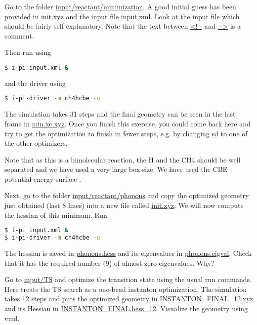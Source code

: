 \documentclass{article}
\begin{document}
\begin{Exercise}[label={reactant},title={Optimizing and analysing the reactant}]

\Question
Go to the folder \url{input/reactant/minimization}.
A good initial guess has been provided in \url{init.xyz} and the input file \url{input.xml}.
Look at the input file which should be fairly self explanatory.  Note that the text between \url{<!--} and \url{-->} is a comment.

Then run \ipi{} using
\begin{lstlisting}[language=bash]
$ i-pi input.xml &
\end{lstlisting}
and the driver using
\begin{lstlisting}[language=bash]
$ i-pi-driver -m ch4hcbe -u
\end{lstlisting}

The simulation takes 31 steps and the final geometry can be seen in the last frame in \url{min.xc.xyz}.
Once you finish this exercise, you could come back here and try to get the optimization to finish in fewer steps, e.g. by changing \url{sd} to one of the other optimizers.

Note that as this is a bimolecular reaction, the H and the CH4 should be well separated and we have used a very large box size.
We have used the CBE potential-energy surface \cite{Corchado2009HCH4}.

\Question
Next, go to the folder \url{input/reactant/phonons} and copy the optimized geometry just obtained (last 8 lines) into a new file called \url{init.xyz}.
We will now compute the hessian of this minimum.
Run
\begin{lstlisting}[language=bash]
$ i-pi input.xml &
$ i-pi-driver -m ch4hcbe -u
\end{lstlisting}

The hessian is saved in \url{phonons.hess} and its eigenvalues in \url{phonons.eigval}.  Check that it has the required number (9) of almost zero eigenvalues.  Why?

\end{Exercise}

\begin{Exercise}[label={TS},title={Optimizing and analysing the transition state}]

Go to \url{input/TS} and optimize the transition state using the usual run commands.
Here \ipi{} treats the TS search as a one-bead instanton optimization.
The simulation takes 12 steps and puts the optimized geometry in \url{INSTANTON_FINAL_12.xyz}
and its Hessian in \url{INSTANTON_FINAL.hess_12}.
Visualize the geometry using vmd.

\end{Exercise}
\end{document}
